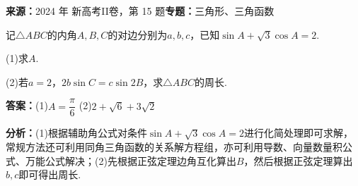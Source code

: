 \begin{question}[points=15]
\textbf{来源：}2024 年 新高考II卷，第 15 题\quad \textbf{专题：}三角形、三角函数\par
记$\triangle ABC$的内角$A,B,C$的对边分别为$a,b,c$，已知$\sin A+\sqrt{3}\cos A=2$.

(1)求$A$.

(2)若$a=2$，$2b\sin C=c\sin 2B$，求$\triangle ABC$的周长.
\begin{solution}
\textbf{答案：}(1)$A=\dfrac{\pi}{6}$
(2)$2+\sqrt{6}+3\sqrt{2}$

\textbf{分析：}(1)根据辅助角公式对条件$\sin A+\sqrt{3}\cos A=2$进行化简处理即可求解，常规方法还可利用同角三角函数的关系解方程组，亦可利用导数、向量数量积公式、万能公式解决；(2)先根据正弦定理边角互化算出$B$，然后根据正弦定理算出$b,c$即可得出周长.


\end{solution}
\end{question}
